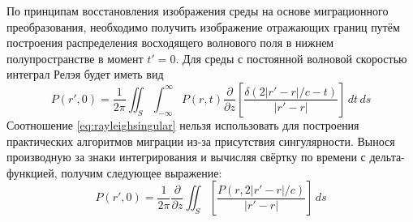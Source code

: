 \documentclass[a4paper, fontsize=14pt]{article}
\begin{document}
	По принципам восстановления изображения среды на основе миграционного преобразования, необходимо получить изображение отражающих границ путём построения распределения восходящего волнового поля в нижнем полупространстве в момент $t' = 0$. Для среды с постоянной волновой скоростью интеграл Релэя будет иметь вид
	\begin{equation}
		P(r',0) = \frac{1}{2\pi} \iint_S \int_{-\infty}^{\infty} P(r,t) \frac{\partial}{\partial z} 
		\left[ \frac{\delta(2|r'-r|/c -t)}{|r'-r|}\right]\,dt\,ds
		\label{eq:rayleighsingular}
	\end{equation}
	Соотношение \ref{eq:rayleighsingular} нельзя использовать для построения практических алгоритмов миграции из-за присутствия сингулярности. Вынося производную за знаки интегрирования и вычисляя свёртку по времени с дельта-функцией, получим следующее выражение:\cite{golubev}
	\begin{equation}
				P(r',0) = \frac{1}{2\pi}\frac{\partial}{\partial z} \iint_S   
		\left[ \frac{P(r,2|r'-r|/c)}{|r'-r|}\right]\,ds
		\label{eq:rayleighgood}
	\end{equation}
\end{document}
